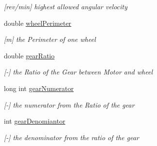 \begin{DoxyCompactItemize}
\begin{DoxyCompactList}\small\item\em \mbox{[}rev/min\mbox{]} highest allowed angular velocity \end{DoxyCompactList}\item 
\hypertarget{structEpos2MotorController_1_1epos2Settings_ab7dfe30a4a13813163437d4d54fa053d}{double \hyperlink{structEpos2MotorController_1_1epos2Settings_ab7dfe30a4a13813163437d4d54fa053d}{wheel\-Perimeter}}\label{structEpos2MotorController_1_1epos2Settings_ab7dfe30a4a13813163437d4d54fa053d}

\begin{DoxyCompactList}\small\item\em \mbox{[}m\mbox{]} the Perimeter of one wheel \end{DoxyCompactList}\item 
\hypertarget{structEpos2MotorController_1_1epos2Settings_adf387ce695bf432caace5e216dda3429}{double \hyperlink{structEpos2MotorController_1_1epos2Settings_adf387ce695bf432caace5e216dda3429}{gear\-Ratio}}\label{structEpos2MotorController_1_1epos2Settings_adf387ce695bf432caace5e216dda3429}

\begin{DoxyCompactList}\small\item\em \mbox{[}-\/\mbox{]} the Ratio of the Gear between Motor and wheel \end{DoxyCompactList}\item 
\hypertarget{structEpos2MotorController_1_1epos2Settings_a1524dd1ea0ca97addfa48ec2ba983c3e}{long int \hyperlink{structEpos2MotorController_1_1epos2Settings_a1524dd1ea0ca97addfa48ec2ba983c3e}{gear\-Numerator}}\label{structEpos2MotorController_1_1epos2Settings_a1524dd1ea0ca97addfa48ec2ba983c3e}

\begin{DoxyCompactList}\small\item\em \mbox{[}-\/\mbox{]} the numerator from the Ratio of the gear \end{DoxyCompactList}\item 
\hypertarget{structEpos2MotorController_1_1epos2Settings_af648530b886ebd8176997645c99aa35b}{int \hyperlink{structEpos2MotorController_1_1epos2Settings_af648530b886ebd8176997645c99aa35b}{gear\-Denomiantor}}\label{structEpos2MotorController_1_1epos2Settings_af648530b886ebd8176997645c99aa35b}

\begin{DoxyCompactList}\small\item\em \mbox{[}-\/\mbox{]} the denominator from the ratio of the gear \end{DoxyCompactList}\end{DoxyCompactItemize}


